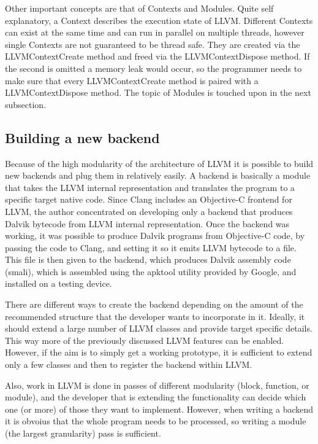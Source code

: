 \documentclass[parskip]{cs4rep}
\begin{document}
Other important concepts are that of Contexts and Modules. Quite self explanatory, a Context describes the execution state of LLVM. Different Contexts can exist at the same time and can run in parallel on multiple threads, however single Contexts are not guaranteed to be thread safe. They are created via the LLVMContextCreate method and freed via the LLVMContextDispose method. If the second is omitted a memory leak would occur, so the programmer needs to make sure that every LLVMContextCreate method is paired with a LLVMContextDispose method. The topic of Modules is touched upon in the next subsection.

\subsection{Building a new backend} \label{sec:buildingANewBackend}

Because of the high modularity of the architecture of LLVM it is possible to build new backends and plug them in relatively easily. A backend is basically a module that takes the LLVM internal representation and translates the program to a specific target native code. Since Clang includes an Objective-C frontend for LLVM, the author concentrated on developing only a backend that produces Dalvik bytecode from LLVM internal representation. Once the backend was working, it was possible to produce Dalvik programs from Objective-C code, by passing the code to Clang, and setting it so it emits LLVM bytecode to a file. This file is then given to the backend, which produces Dalvik assembly code (smali), which is assembled using the apktool utility provided by Google, and installed on a testing device.

There are different ways to create the backend depending on the amount of the recommended structure that the developer wants to incorporate in it. Ideally, it should extend a large number of LLVM classes and provide target specific details\cite{P8}. This way more of the previously discussed LLVM features can be enabled. However, if the aim is to simply get a working prototype, it is sufficient to extend only a few classes and then to register the backend within LLVM.

Also, work in LLVM is done in passes of different modularity (block, function, or module), and the developer that is extending the functionality can decide which one (or more) of those they want to implement. However, when writing a backend it is obvoius that the whole program needs to be processed, so writing a module (the largest granularity) pass is sufficient.
\end{document}
